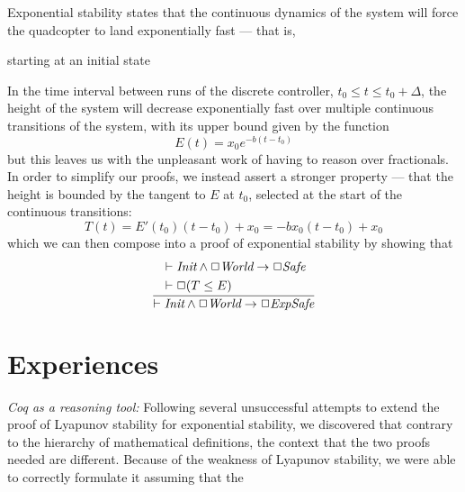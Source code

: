 \documentclass{sigplanconf}
\begin{document}



Exponential stability states that the continuous dynamics of the system will force the quadcopter to land exponentially fast --- that is,

starting at an initial state

In the time interval between runs of the discrete controller, $t_0\leq t \leq t_0+\Delta$, the height of the system will decrease exponentially fast over multiple continuous transitions of the system, with its upper bound given by the function
 \[E(t)=x_0e^{-b(t-t_0)}\]
but this leaves us with the unpleasant work of having to reason over fractionals. In order to simplify our proofs, we instead assert a stronger property --- that the height is bounded by the tangent to $E$ at $t_0$, selected at the start of the continuous transitions:
\[T(t) = E'(t_0)(t-t_0)+x_0 = -bx_0(t-t_0)+x_0\]
which we can then compose into a proof of exponential stability by showing that
\[
  \frac
  {\begin{aligned}
      & \vdash \emph{Init} \land \Box \emph{World} \rightarrow \Box \emph{Safe} \\
      & \vdash \Box (T\leq E)
    \end{aligned}}
  {\vdash \emph{Init} \land \Box \emph{World} \rightarrow \Box \emph{ExpSafe}}
\]



\section {Experiences}

\emph{Coq as a reasoning tool: } Following several unsuccessful attempts to extend the proof of Lyapunov stability for exponential stability, we discovered that contrary to the hierarchy of mathematical definitions, the context that the two proofs needed are different. Because of the weakness of Lyapunov stability, we were able to correctly formulate it assuming that the


\end{document}
